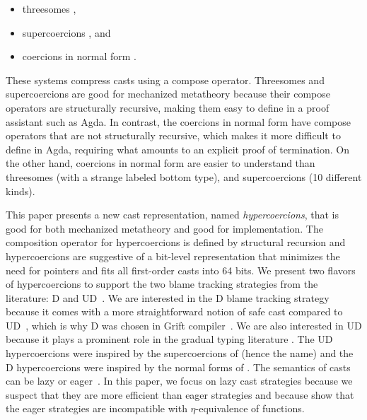 \documentclass[acmsmall,review,anonymous]{acmart}\settopmatter{printfolios=true,printccs=false,printacmref=false}
\begin{document}
\begin{itemize}
\item threesomes \citep{siek2010threesomes,garcia2013calculating},
\item supercoercions \citep{garcia2013calculating}, and
\item coercions in normal form
  \citep{siek2012interpretations,siek2015blame}.
\end{itemize}
These systems compress casts using a compose operator.
Threesomes and supercoercions are good for mechanized
metatheory because their compose operators are structurally recursive,
making them easy to define in a proof assistant such as Agda. In
contrast, the coercions in normal form have compose operators that are
not structurally recursive, which makes it more difficult to define in
Agda, requiring what amounts to an explicit proof of termination.
%
On the other hand, coercions in normal form are easier to understand
than threesomes (with a strange labeled bottom type), and
supercoercions (10 different kinds).

This paper presents a new cast representation, named
\emph{hypercoercions}, that is good for both mechanized metatheory and
good for implementation. The composition operator for hypercoercions
is defined by structural recursion and hypercoercions are suggestive
of a bit-level representation that minimizes the need for pointers and
fits all first-order casts into 64 bits.
%
We present two flavors of hypercoercions to support the two blame
tracking strategies from the literature: D and
UD~\citep{siek2009exploring}. We are interested in the D blame
tracking strategy because it comes with a more straightforward notion of
safe cast compared to UD~\citep{siek2009exploring}, which is why D was
chosen in Grift compiler~\citep{kuhlenschmidt2018efficient}. We are also 
interested in UD because it plays a
prominent role in the gradual typing literature
\citep{wadler2009well}.  The UD hypercoercions were inspired by the
supercoercions of \citet{garcia2013calculating} (hence the name) and
the D hypercoercions were inspired by the normal forms of
\citet{siek2012interpretations}.
%
The semantics of casts can be lazy or
eager~\citep{siek2009exploring}. In this paper, we focus on lazy cast
strategies because we suspect that they are more efficient than eager
strategies and because \citet{new2019gradual} show that the eager
strategies are incompatible with $\eta$-equivalence of functions.
\end{document}
